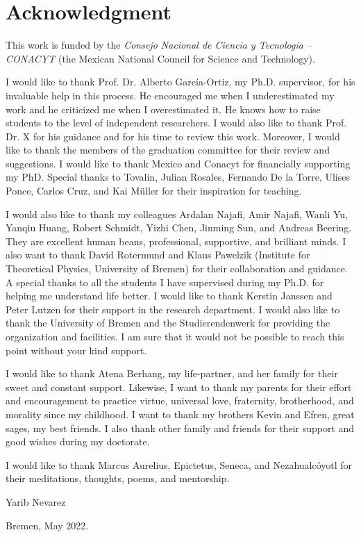 \chapter*{Acknowledgment}
\thispagestyle{empty}
This work is funded by the \textit{Consejo Nacional de Ciencia y Tecnologia -- CONACYT} (the Mexican National Council for Science and Technology).

I would like to thank Prof. Dr. Alberto Garc\'ia-Ortiz, my Ph.D. supervisor, for his invaluable help in this process. He encouraged me when I underestimated my work and he criticized me when I overestimated it. He knows how to raise students to the level of independent researchers. I would also like to thank Prof. Dr. X for his guidance and for his time to review this work. Moreover, I would like to thank the members of the graduation committee for their review and suggestions. I would like to thank Mexico and Conacyt for financially supporting my PhD. Special thanks to Tovalin, Julian Rosales, Fernando De la Torre, Ulises Ponce, Carlos Cruz, and Kai M\"uller for their inspiration for teaching.

I would also like to thank my colleagues Ardalan Najafi, Amir Najafi, Wanli Yu, Yanqiu Huang, Robert Schmidt, Yizhi Chen, Jinming Sun, and Andreas Beering. They are excellent human beans, professional, supportive, and brilliant minds. I also want to thank David Rotermund and Klaus Pawelzik (Institute for Theoretical Physics, University of Bremen) for their collaboration and guidance. A special thanks to all the students I have supervised during my Ph.D. for helping me understand life better. I would like to thank Kerstin Janssen and Peter Lutzen for their support in the research department. I would also like to thank the University of Bremen and the Studierendenwerk for providing the organization and facilities. I am sure that it would not be possible to reach this point without your kind support.


I would like to thank Atena Berhang, my life-partner, and her family for their sweet and constant support. Likewise, I want to thank my parents for their effort and encouragement to practice virtue, universal love, fraternity, brotherhood, and morality since my childhood. I want to thank my brothers Kevin and Efren, great sages, my best friends. I also thank other family and friends for their support and good wishes during my doctorate.

I would like to thank Marcus Aurelius, Epictetus, Seneca, and Nezahualc\'oyotl for their meditations, thoughts, poems, and mentorship.


Yarib Nevarez

Bremen, May 2022.




